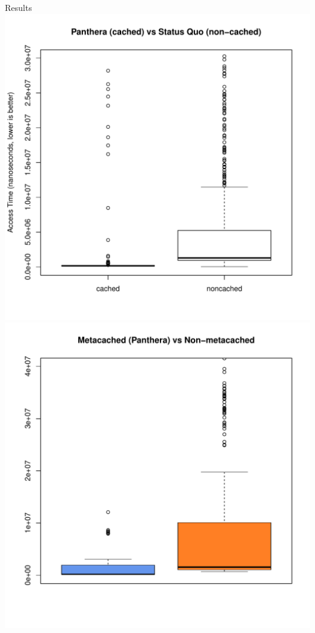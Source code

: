\documentclass[final]{beamer} %
\begin{document}
\begin{frame}
\begin{columns}[t]
\begin{column}{0.32\textwidth}
	\begin{block}{Results}
		\includegraphics[scale=1.2]{assets/box-plot-data.pdf}
		\vspace{1em}
		\includegraphics[scale=1.2]{assets/box-plot-metadata.pdf}

\end{block}
\end{column}
\end{columns}
\end{frame}
\end{document}
